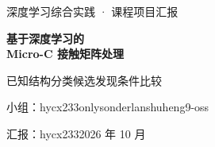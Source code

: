 \begin{frame}[plain]
\vspace{0.5em}
{\small\textcolor{projectblue}{深度学习综合实践 · 课程项目汇报}\par}
\vspace{1.2em}
{\LARGE\bfseries\textcolor{projectblue}{基于深度学习的\\[0.35em]Micro-C 接触矩阵处理}\par}
\vspace{1.2em}
{\large 已知结构分类\quad 候选发现\quad 条件比较\par}
\vspace{1.7em}
{\normalsize 小组：hycx233\quad onlysonder\quad lanshuheng9-oss\par}
{\small 汇报：hycx233\hfill 2026 年 10 月}
\end{frame}
